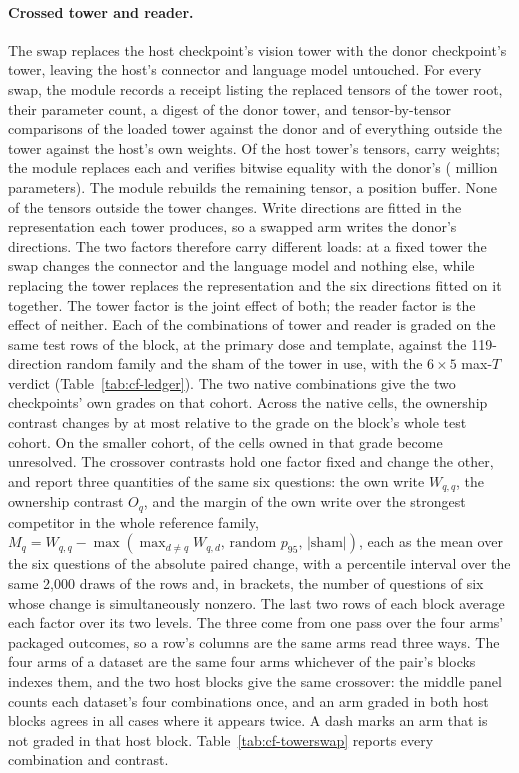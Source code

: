 \documentclass{article}
\begin{document}
\paragraph{Crossed tower and reader.} The swap replaces the host checkpoint's vision tower with the donor checkpoint's tower, leaving the host's connector and language model untouched. For every swap, the module records a receipt listing the replaced tensors of the tower root, their parameter count, a digest of the donor tower, and tensor-by-tensor comparisons of the loaded tower against the donor and of everything outside the tower against the host's own weights. Of the host tower's \cfSwapTowerTensors{} tensors, \cfSwapTensors{} carry weights; the module replaces each and verifies bitwise equality with the donor's (\cfSwapParamsM{} million parameters). The module rebuilds the remaining tensor, a position buffer. None of the \cfSwapOutside{} tensors outside the tower changes. Write directions are fitted in the representation each tower produces, so a swapped arm writes the donor's directions. The two factors therefore carry different loads: at a fixed tower the swap changes the connector and the language model and nothing else, while replacing the tower replaces the representation and the six directions fitted on it together. The tower factor is the joint effect of both; the reader factor is the effect of neither. Each of the \cfSwapCombos{} combinations of tower and reader is graded on the same \cfSwapRows{} test rows of the block, at the primary dose and template, against the 119-direction random family and the sham of the tower in use, with the $6\times5$ max-$T$ verdict (Table~\ref{tab:cf-ledger}). The two native combinations give the two checkpoints' own grades on that cohort. Across the \cfSwapNativeCells{} native cells, the ownership contrast changes by at most \cfSwapNativeMaxDO{} relative to the grade on the block's whole test cohort. On the smaller cohort, \cfSwapNativeUnresolved{} of the \cfSwapNativeOwnedFull{} cells owned in that grade become unresolved. The crossover contrasts hold one factor fixed and change the other, and report three quantities of the same six questions: the own write $W_{q,q}$, the ownership contrast $O_q$, and the margin of the own write over the strongest competitor in the whole reference family, $M_q=W_{q,q}-\max(\max_{d\neq q}W_{q,d},\,\text{random }p_{95},\,|\text{sham}|)$, each as the mean over the six questions of the absolute paired change, with a percentile interval over the same 2{,}000 draws of the rows and, in brackets, the number of questions of six whose change is simultaneously nonzero. The last two rows of each block average each factor over its two levels. The three come from one pass over the four arms' packaged outcomes, so a row's columns are the same arms read three ways. The four arms of a dataset are the same four arms whichever of the pair's blocks indexes them, and the two host blocks give the same crossover: the middle panel counts each dataset's four combinations once, and an arm graded in both host blocks agrees in all \cfSwapArmsTwice{} cases where it appears twice. A dash marks an arm that is not graded in that host block. Table~\ref{tab:cf-towerswap} reports every combination and contrast.
\end{document}
